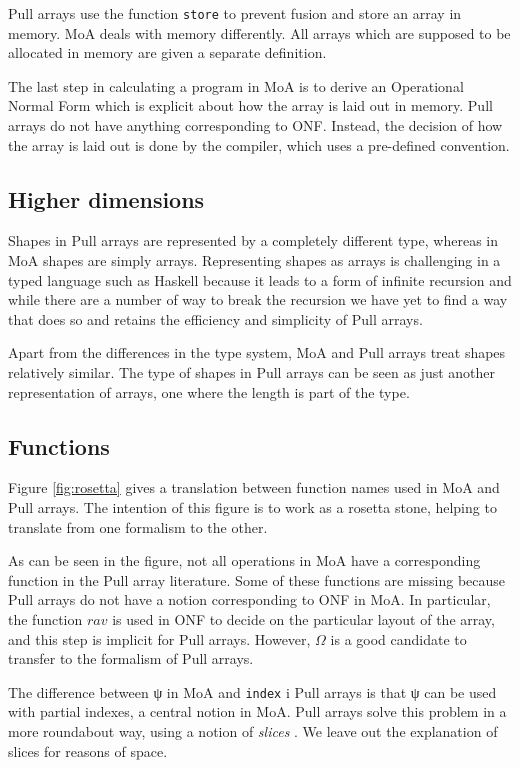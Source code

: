 \documentclass[preprint]{sigplanconf}
\begin{document}
Pull arrays use the function \verb!store! to prevent fusion and store
an array in memory. MoA deals with memory differently. All arrays
which are supposed to be allocated in memory are given a separate
definition.

The last step in calculating a program in MoA is to derive an
Operational Normal Form which is explicit about how the array is laid
out in memory. Pull arrays do not have anything corresponding to
ONF. Instead, the decision of how the array is laid out is done by the
compiler, which uses a pre-defined convention.

\subsection{Higher dimensions}
\label{sec:highdim}

Shapes in Pull arrays are represented by a completely different type,
whereas in MoA shapes are simply arrays. Representing shapes as arrays
is challenging in a typed language such as Haskell because it leads to
a form of infinite recursion and while there are a number of way to
break the recursion we have yet to find a way that does so and retains
the efficiency and simplicity of Pull arrays.

Apart from the differences in the type system, MoA and Pull arrays
treat shapes relatively similar. The type of shapes in Pull arrays can
be seen as just another representation of arrays, one where the length
is part of the type.

\subsection{Functions}
\label{sec:notation}

Figure \ref{fig:rosetta} gives a translation between function names
used in MoA and Pull arrays. The intention of this figure is to work
as a rosetta stone, helping to translate from one formalism to the
other.

As can be seen in the figure, not all operations in MoA have a
corresponding function in the Pull array literature. Some of these
functions are missing because Pull arrays do not have a notion
corresponding to ONF in MoA. In particular, the function $rav$ is used
in ONF to decide on the particular layout of the array, and this step
is implicit for Pull arrays. However, $\Omega$ is a good candidate to
transfer to the formalism of Pull arrays.

The difference between ψ in MoA and \verb!index! i Pull arrays is that
ψ can be used with partial indexes, a central notion in MoA. Pull
arrays solve this problem in a more roundabout way, using a notion of
\emph{slices} \cite{keller2010regular}. We leave out the explanation
of slices for reasons of space.
\end{document}
